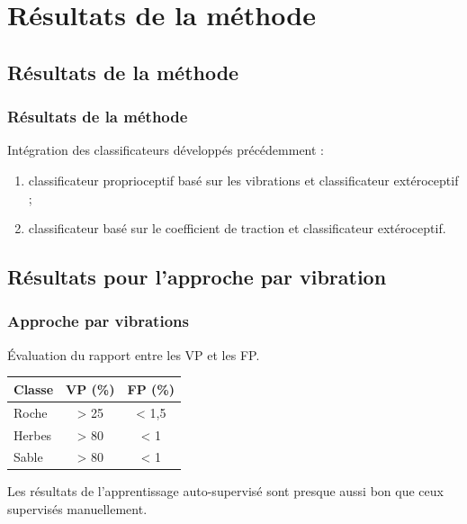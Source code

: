 \section{Résultats de la méthode}

\subsection{Résultats de la méthode}
    \begin{frame}
        \frametitle{Résultats de la méthode}
        Intégration des classificateurs développés précédemment :
        \begin{enumerate}
            \item classificateur proprioceptif basé sur les vibrations et classificateur extéroceptif ;
            \item classificateur basé sur le coefficient de traction et classificateur extéroceptif.
        \end{enumerate}         
    \end{frame}

\subsection{Résultats pour l'approche par vibration}
    \begin{frame}
        \frametitle{Approche par vibrations}
        Évaluation du rapport entre les VP et les FP.
        \begin{center}              
            \begin{tabular}{|lcc|}
                \hline
                Classe & VP (\%) &  FP (\%)\\
                \hline
                Roche & > 25 & < 1,5 \\
                Herbes & > 80 & < 1 \\
                Sable & > 80 & < 1\\
                \hline           
            \end{tabular}                  
        \end{center} 
        Les résultats de l'apprentissage auto-supervisé sont presque aussi bon que ceux supervisés manuellement. 
    \end{frame}

